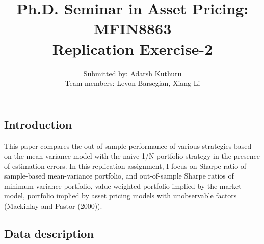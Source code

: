 \documentclass[11pt]{article}
\title{\Large \bf Ph.D. Seminar in Asset Pricing: MFIN8863 \\
Replication Exercise-2}
\author{Submitted by: Adarsh Kuthuru\\
Team members: Levon Barsegian, Xiang Li}
\date{\parbox{\linewidth}{\centering%
  \today\endgraf\bigskip
  \endgraf\medskip
  PhD Students in Finance \endgraf
  Boston College, United States}}
\begin{document}
\maketitle
\thispagestyle{empty}
\bigskip
\clearpage
\tableofcontents

\onehalfspacing      %
\renewcommand{\footnote}{\endnote}  %

\clearpage



\section{\cite{demiguel2009optimal}} \label{sec:De}

\subsection{Introduction}
 This paper compares the out-of-sample performance of various strategies based on the mean-variance model with the naive 1/N portfolio strategy in the presence of estimation errors. In this replication assignment, I focus on Sharpe ratio of sample-based mean-variance portfolio, and out-of-sample Sharpe ratios of minimum-variance portfolio, value-weighted portfolio implied by the market model, portfolio implied by asset pricing models with unobservable factors (Mackinlay and Pastor (2000)). 


\subsection{Data description}
\end{document}
